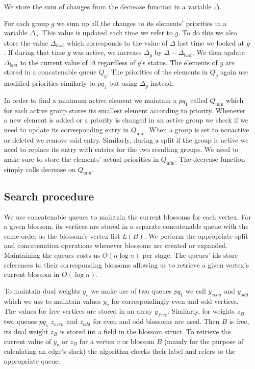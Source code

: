 We store the sum of changes from the decrease function in a variable $\Delta$.

For each group $g$ we sum up all the changes to its elements' priorities in a variable $\Delta_g$. This value is updated each time we refer to $g$. To do this we also store the value $\Delta_{last}$ which corresponds to the value of $\Delta$ last time we looked at $g$. If during that time $g$ was active, we increase $\Delta_g$ by $\Delta - \Delta_{last}$. We then update $\Delta_{last}$ to the current value of $\Delta$ regardless of $g$'s status. The elements of $g$ are stored in a concatenable queue $Q_g$. The priorities of the elements in $Q_g$ again use modified priorities similarly to $pq_1$ but using $\Delta_g$ instead. 

In order to find a minimum active element we maintain a $pq_1$ called $Q_{\min}$ which for each active group stores its smallest element according to priority. Whenever a new element is added or a priority is changed in an active group we check if we need to update its corresponding entry in $Q_{\min}$. When a group is set to nonactive or deleted we remove said entry. Similarly, during a split if the group is active we need to replace its entry with entries for the two resulting groups. We need to make sure to store the elements' actual priorities in $Q_{\min}$. The decrease function simply calls decrease on $Q_{\min}$.

\subsection{Search procedure}

We use concatenable queues to maintain the current blossoms for each vertex. For a given blossom, its vertices are stored in a separate concatenable queue with the same order as the blossom's vertex list $L(B)$. We perform the appropriate split and concatenation operations whenever blossoms are created or expanded. Maintaining the queues costs us $O(n\log n)$ per stage. The queues' ids store references to their corresponding blossoms allowing us to retrieve a given vertex's current blossom in $O(\log n)$.

To maintain dual weights $y_v$ we make use of two queues $pq_1$ we call $y_{even}$ and $y_{odd}$ which we use to maintain values $y_v$ for correspondingly even and odd vertices. The values for free vertices are stored in an array $y_{free}$. Similarly, for weights $z_B$ two queues $pq_1$ $z_{even}$ and $z_{odd}$ for even and odd blossoms are used. Then $B$ is free, its dual weight $z_B$ is stored int a field in the blossom struct. To retrieve the current value of $y_v$ or $z_B$ for a vertex $v$ or blossom $B$ (mainly for the purpose of calculating an edge's slack) the algorithm checks their label and refers to the appropriate queue.

